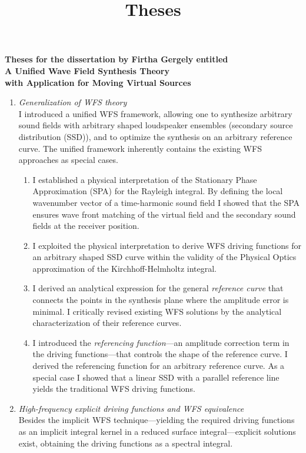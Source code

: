 \documentclass[a4paper,10pt]{article}
\title{Theses}
\date{}
\begin{document}
\begin{center}
  \textbf{\normalsize Theses for the dissertation by Firtha Gergely entitled\\
   		  \Large A Unified Wave Field Synthesis Theory \\ \normalsize with Application for Moving Virtual Sources}\\[0.5cm]
\end{center}

\begin{enumerate}
\item \emph{Generalization of WFS theory} \\ 
I introduced a unified WFS framework, allowing one to synthesize arbitrary sound fields with arbitrary shaped loudspeaker ensembles (secondary source distribution (SSD)), and to optimize the synthesis on an arbitrary reference curve. 
The unified framework inherently contains the existing WFS approaches as special cases.
\begin{enumerate}
\item \label{th:SPAinterpret} I established a physical interpretation of the Stationary Phase Approximation (SPA) for the Rayleigh integral.
By defining the local wavenumber vector of a time-harmonic sound field I showed that the SPA ensures wave front matching of the virtual field and the secondary sound fields at the receiver position.
\item I exploited the physical interpretation to derive WFS driving functions for an arbitrary shaped SSD curve within the validity of the Physical Optics approximation of the Kirchhoff-Helmholtz integral.
\item I derived an analytical expression for the general \emph{reference curve} that connects the points in the synthesis plane where the amplitude error is minimal.
I critically revised existing WFS solutions by the analytical characterization of their reference curves.
\item I introduced the \emph{referencing function}---an amplitude correction term in the driving functions---that controls the shape of the reference curve.
I derived the referencing function for an arbitrary reference curve.
As a special case I showed that a linear SSD with a parallel reference line yields the traditional WFS driving functions.
\end{enumerate}
%
\item \emph{High-frequency explicit driving functions and WFS equivalence}\\
Besides the implicit WFS technique---yielding the required driving functions as an implicit integral kernel in a reduced surface integral---explicit solutions exist, obtaining the driving functions as a spectral integral.

\end{enumerate}
\end{document}
